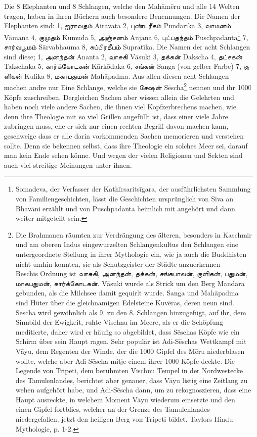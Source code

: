 \documentclass{article}
\newcommand{\TamilText}[1]{\texttamil{#1}}
\newcommand{\tam}[1]{\TamilText{#1}}
\begin{document}
Die 8 Elephanten und 8 Schlangen, welche den Mah\={a}m\={e}ru und alle 14 Welten tragen, haben in ihren Büchern auch besondere Benennungen. Die Namen der Elephanten sind: 1, \tam{ஐராவதம்} Air\={a}vata 2, \tam{புண்டரீகம்} Pundar\={i}ka 3, \tam{வாமனம்} V\={a}mana 4, \tam{குமுதம்} Kumuda 5, \tam{அஞ்சனம்} Anjana 6, \tam{புட்பதந்தம்} Puschpadanta\footnote{Somadeva, der Verfasser der Kath\={i}rsarits\={i}gara, der ausführlichsten Sammlung von Familiengeschichten, lässt die Geschichten ursprünglich von Siva an Bhav\={a}ni erzählt und von Puschpadanta heimlich mit angehört und dann weiter mitgeteilt sein.} 7, \tam{சார்வபூமம்} S\={a}rvabhauma 8, \tam{சுப்பிரதீபம்} Suprat\={i}ka. Die Namen der acht Schlangen sind diese; 1, \tam{அனந்தன்} Ananta 2, \tam{வாசுகி} V\={a}suki 3, \tam{தக்கன்} Dakscha 4, \tam{தட்சகன்} Takschaka 5, \tam{கார்க்கோடகன்} K\={a}rk\={o}daka 6, \tam{சங்கன்} Sanga (von gelber Farbe) 7, \tam{குளிகன்} Kulika 8, \tam{மகாபதுமன்} Mah\={a}padma. Aus allen diesen acht Schlangen machen andre nur Eine Schlange, welche sie \tam{சேஷன்} S\={e}scha\footnote{Die Brahmanen räumten zur Verdrängung des älteren, besonders in Kaschmir und am oberen Indus eingewurzelten Schlangenkultus den Schlangen eine untergeordnete Stellung in ihrer Mythologie ein, wie ja auch die Buddhisten nicht umhin konnten, sie als Schutzgeister der Städte anzuerkennen — Beschis Ordnung ist \tam{வாசுகி}, \tam{அனந்தன்}, \tam{தக்கன்}, \tam{சங்கபாலன்}, \tam{குளிகன்}, \tam{பதுமன்}, \tam{மாகபதுமன்}, \tam{கார்க்கோடகன்}. V\={a}suki wurde als Strick um den Berg Mandara gebunden, als die Milchsee damit gequirlt wurde. Sanga und Mah\={a}padma sind Hüter über die gleichnamigen Edelsteine Kuv\={e}ras, deren neun sind. S\={e}scha wird gewöhnlich als 9. zu den 8. Schlangen hinzugefügt, auf ihr, dem Sinnbild der Ewigkeit, ruhte Vischnu im Meere, als er die Schöpfung meditierte, daher wird er häufig so abgebildet, dass S\={e}schas Köpfe wie ein Schirm über sein Haupt ragen. Sehr populär ist Adi-S\={e}schas Wettkampf mit V\={a}yu, dem Regenten der Winde, der die 1000 Gipfel des M\={e}ru niederblasen wollte, welche aber Adi-S\={e}scha mitje einem ihrer 1000 Köpfe deckte. Die Legende von Tripeti, dem berühmten Vischnu Tempel in der Nordwestecke des Tamulenlandes, berichtet aber genauer, dass V\={a}yu listig eine Zeitlang zu wehen aufgehört habe, und Adi-S\={e}scha dann, um zu rekognoszieren, dass eine Haupt ausreckte, in welchem Moment V\={a}yu wiederum einsetzte und den einen Gipfel fortblies, welcher an der Grenze des Tamulenlandes niedergefallen, jetzt den heiligen Berg von Tripeti bildet. Taylors Hindu Mythologie, p. 1-2.} nennen und ihr 1000 Köpfe zuschreiben. Dergleichen Sachen aber wissen allein die Gelehrten und haben noch viele andere Sachen, die ihnen viel Kopfzerbrechens machen, wie denn ihre Theologie mit so viel Grillen angefüllt ist, dass einer viele Jahre zubringen muss, ehe er sich nur einen rechten Begriff davon machen kann, geschweige dass er alle darin vorkommenden Sachen memorieren und verstehen sollte. Denn sie bekennen selbst, dass ihre Theologie ein solches Meer sei, darauf man kein Ende sehen könne. Und wegen der vielen Religionen und Sekten sind auch viel streitige Meinungen unter ihnen.
\end{document}
